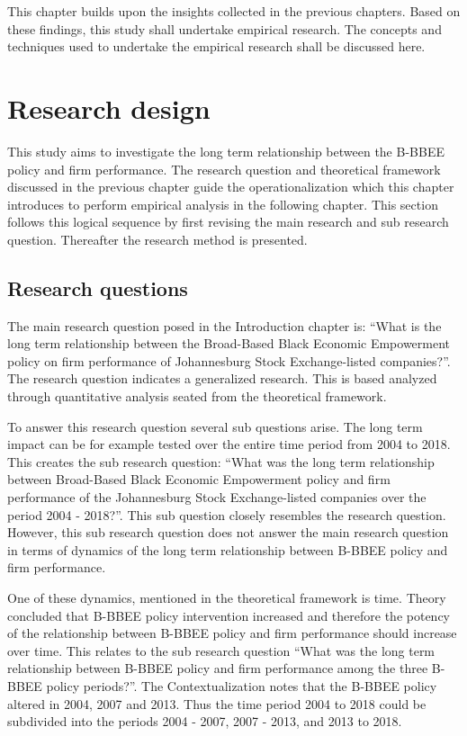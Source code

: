 This chapter builds upon the insights collected in the previous chapters. Based on these findings, this study shall undertake empirical research. The concepts and techniques used to undertake the empirical research shall be discussed here. 
\section{Research design}
This study aims to investigate the long term relationship between the B-BBEE policy and firm performance. The research question and theoretical framework discussed in the previous chapter guide the operationalization which this chapter introduces to perform empirical analysis in the following chapter. This section follows this logical sequence by first revising the main research and sub research question. Thereafter the research method is presented.
\subsection{Research questions}
The main research question posed in the Introduction chapter is: “What is the long term relationship between the Broad-Based Black Economic Empowerment policy on firm performance of Johannesburg Stock Exchange-listed companies?”.  The research question indicates a generalized research. This is based analyzed through quantitative analysis seated from the theoretical framework.

To answer this research question several sub questions arise. The long term impact can be for example tested over the entire time period from 2004 to 2018. This creates the sub research question: “What was the long term relationship between Broad-Based Black Economic Empowerment policy and firm performance of the Johannesburg Stock Exchange-listed companies over the period 2004 - 2018?”.  This sub question closely resembles the research question. However, this sub research question does not answer the main research question in terms of dynamics of the long term relationship between B-BBEE policy and firm performance.

One of these dynamics, mentioned in the theoretical framework is time.  Theory concluded that B-BBEE policy intervention increased and therefore the potency of the relationship between B-BBEE policy and firm performance should increase over time. This relates to the sub research question “What was the long term relationship between B-BBEE policy and firm performance among the three B-BBEE policy periods?”. The Contextualization notes that the B-BBEE policy altered in 2004, 2007 and 2013. Thus the time period 2004 to 2018 could be subdivided into the periods 2004 - 2007, 2007 - 2013, and 2013 to 2018.

